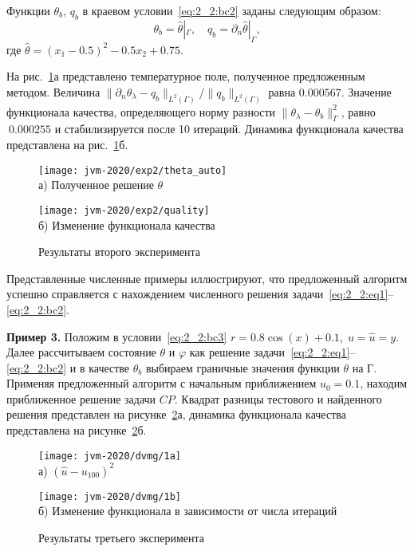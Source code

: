 Функции $\theta_b$, $q_b$ в краевом условии~\eqref{eq:2_2:bc2} заданы следующим образом:
\[
    \theta_b = \widehat{\theta}|_{\Gamma}, \quad q_b = \partial_n \widehat{\theta}|_{\Gamma},
\]
где $\widehat{\theta} = (x_1-0.5)^2 - 0.5x_2+0.75$.


На рис.~\ref{fig:4_4:1}а представлено температурное поле, полученное
предложенным методом.
Величина $\|\partial_n\theta_\lambda-q_b\|_{L^2(\Gamma)}/\|q_b\|_{L^2(\Gamma)}$ равна $0.000567$.
Значение функционала качества, определяющего норму разности $\|\theta_\lambda -\theta_b\|^2_\Gamma$,
равно $~0.000255$ и стабилизируется после 10 итераций.
Динамика функционала качества представлена на рис.~\ref{fig:4_4:1}б.

\begin{figure}[h!t]
    \begin{minipage}[b][][b]{0.49\linewidth}
        \centering
        \texttt{[image: jvm-2020/exp2/theta\_auto]}
        \\ а) Полученное решение $\theta$
    \end{minipage}
    \hfill
    \begin{minipage}[b][][b]{0.49\linewidth}
        \centering
        \texttt{[image: jvm-2020/exp2/quality]}
        \\ б) Изменение функционала качества
    \end{minipage}
    \caption{Результаты второго эксперимента}
    \label{fig:4_4:1}
\end{figure}

Представленные численные примеры иллюстрируют, что предложенный алгоритм успешно справляется
с нахождением численного решения задачи~\eqref{eq:2_2:eq1}--\eqref{eq:2_2:bc2}.


\textbf{Пример 3.}
Положим в условии~\eqref{eq:2_2:bc3}
$r=0.8 \cos (x)+0.1,\; u=\hat{u}=y$.
Далее рассчитываем состояние $\theta$ и $\varphi$ как решение
задачи~\eqref{eq:2_2:eq1}--\eqref{eq:2_2:bc2}
и в качестве $\theta_{b}$ выбираем граничные значения функции $\theta$ на Г.
Применяя предложенный алгоритм с начальным приближением $u_{0}=0.1$,
находим приближенное решение задачи $CP$.
Квадрат разницы тестового и найденного решения представлен на рисунке~\ref{fig:4_4:2}а,
динамика функционала качества представлена на рисунке~\ref{fig:4_4:2}б.

\begin{figure}[h!t]
    \begin{minipage}[b][][b]{0.49\linewidth}
        \centering
        \texttt{[image: jvm-2020/dvmg/1a]}
        \\ а) $\left(\hat{u}-u_{100}\right)^{2}$
    \end{minipage}
    \hfill
    \begin{minipage}[b][][b]{0.49\linewidth}
        \centering
        \texttt{[image: jvm-2020/dvmg/1b]}
        \\ б) Изменение функционала в зависимости от числа итераций
    \end{minipage}
    \caption{Результаты третьего эксперимента}
    \label{fig:4_4:2}
\end{figure}


